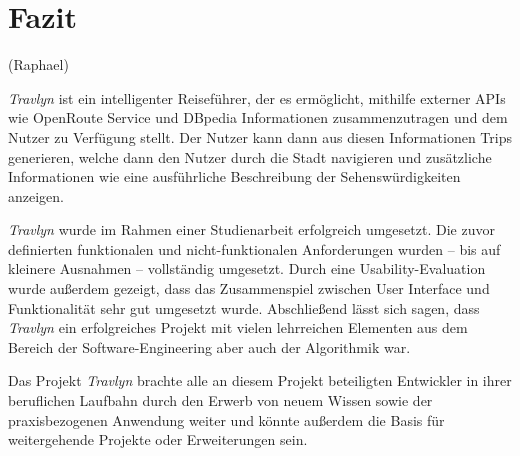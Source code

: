 \chapter{Fazit}

	(Raphael)

	\textit{Travlyn} ist ein intelligenter Reiseführer, der es ermöglicht, mithilfe externer \acs{API}s wie OpenRoute Service und DBpedia Informationen zusammenzutragen und dem Nutzer zu Verfügung stellt. Der Nutzer kann dann aus diesen Informationen Trips generieren, welche dann den Nutzer durch die Stadt navigieren und zusätzliche Informationen wie eine ausführliche Beschreibung der Sehenswürdigkeiten anzeigen. 
	
	\textit{Travlyn} wurde im Rahmen einer Studienarbeit erfolgreich umgesetzt. Die zuvor definierten funktionalen und nicht-funktionalen Anforderungen wurden -- bis auf kleinere Ausnahmen -- vollständig umgesetzt. Durch eine Usability-Evaluation wurde außerdem gezeigt, dass das Zusammenspiel zwischen User Interface und Funktionalität sehr gut umgesetzt wurde. Abschließend lässt sich sagen, dass \textit{Travlyn} ein erfolgreiches Projekt mit vielen lehrreichen Elementen aus dem Bereich der Software-Engineering aber auch der Algorithmik war. 
	
	Das Projekt \textit{Travlyn} brachte alle an diesem Projekt beteiligten Entwickler in ihrer beruflichen Laufbahn durch den Erwerb von neuem Wissen sowie der praxisbezogenen Anwendung weiter und könnte außerdem die Basis für weitergehende Projekte oder Erweiterungen sein. 
